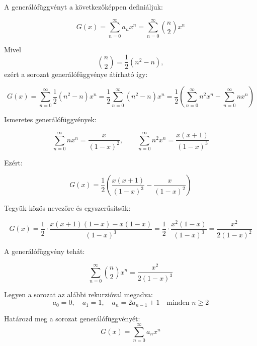\begin{solution}
A generálófüggvényt a következőképpen definiáljuk:

\[
G(x)=\sum_{n=0}^{\infty}a_{n}x^{n}=\sum_{n=0}^{\infty}\binom{n}{2}x^{n}
\]

Mivel 
\[
\binom{n}{2}=\frac{1}{2}(n^{2}-n),
\]
ezért a sorozat generálófüggvénye átírható így:

\[
G(x)=\sum_{n=0}^{\infty}\frac{1}{2}(n^{2}-n)x^{n}=\frac{1}{2}\sum_{n=0}^{\infty}(n^{2}-n)x^{n}=\frac{1}{2}\left(\sum_{n=0}^{\infty}n^{2}x^{n}-\sum_{n=0}^{\infty}nx^{n}\right)
\]

Ismeretes generálófüggvények:

\[
\sum_{n=0}^{\infty}nx^{n}=\frac{x}{(1-x)^{2}},\qquad\sum_{n=0}^{\infty}n^{2}x^{n}=\frac{x(x+1)}{(1-x)^{3}}
\]

Ezért:

\[
G(x)=\frac{1}{2}\left(\frac{x(x+1)}{(1-x)^{3}}-\frac{x}{(1-x)^{2}}\right)
\]

Tegyük közös nevezőre és egyszerűsítsük:

\[
G(x)=\frac{1}{2}\cdot\frac{x(x+1)(1-x)-x(1-x)}{(1-x)^{3}}=\frac{1}{2}\cdot\frac{x^{2}(1-x)}{(1-x)^{3}}=\frac{x^{2}}{2(1-x)^{2}}
\]

A generálófüggvény tehát:

\[
\boxed{\sum_{n=0}^{\infty}\binom{n}{2}x^{n}=\frac{x^{2}}{2(1-x)^{3}}}
\]
\end{solution}
\begin{extraproblem}
Legyen a sorozat az alábbi rekurzióval megadva: 
\[
a_{0}=0,\quad a_{1}=1,\quad a_{n}=2a_{n-1}+1\quad\text{minden }n\geq2
\]

Határozd meg a sorozat generálófüggvényét: 
\[
G(x)=\sum_{n=0}^{\infty}a_{n}x^{n}
\]
\end{extraproblem}

